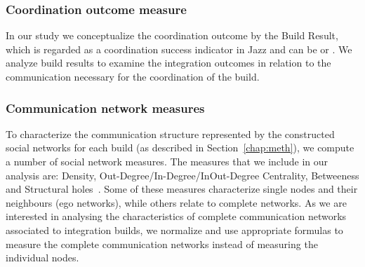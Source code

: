 \subsubsection{Coordination outcome measure}
In our study we conceptualize the coordination outcome by the Build Result,
which is regarded as a coordination success indicator in Jazz and can be \error
or \ok. We analyze build results to examine the integration
outcomes in relation to the communication necessary for the coordination of the
build.
%


\subsubsection{Communication network measures}
To characterize the communication structure represented by the constructed social
networks for each build (as described in Section~\ref{chap:meth}), we compute a number of social network measures. The
measures that we include in our analysis are: Density, Out-Degree/In-Degree/InOut-Degree Centrality, Betweeness and Structural holes~\cite{Freeman:1979rl}. Some of these measures characterize single nodes and their neighbours (ego
networks), while others relate to complete networks. As we are interested in
analysing the characteristics of complete communication networks associated to
integration builds, we normalize and use appropriate formulas to measure the
complete communication networks instead of measuring the individual nodes.



